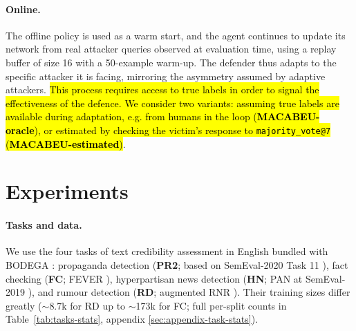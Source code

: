 \documentclass[11pt]{article}
\begin{document}
\paragraph{Online.} The offline policy is used as a warm start, and the agent continues to update its network from real attacker queries observed at evaluation time, using a replay buffer of size 16 with a 50-example warm-up. The defender thus adapts to the specific attacker it is facing, mirroring the asymmetry assumed by adaptive attackers. \hl{This process requires access to true labels in order to signal the effectiveness of the defence. We consider two variants: assuming true labels are available during adaptation, e.g. from humans in the loop (\textbf{MACABEU-oracle}), or estimated by checking the victim's response to \texttt{majority\_vote@7} (\textbf{MACABEU-estimated})}. 


\section{Experiments}
\label{sec:experiments}
\paragraph{Tasks and data.}
We use the four tasks of text credibility assessment in English bundled with BODEGA \citep{verifying_robustness}: propaganda detection (\textbf{PR2}; based on SemEval-2020 Task 11 \citep{DaSanMartino2020semeval}), fact checking (\textbf{FC}; FEVER \citep{Thorne2018fever}), hyperpartisan news detection (\textbf{HN}; PAN at SemEval-2019 \citep{Kiesel2019hyperpartisan}), and rumour detection (\textbf{RD}; augmented RNR \citep{Zubiaga2016rumours}). Their training sizes differ greatly ($\sim$8.7k for RD up to $\sim$173k for FC; full per-split counts in Table~\ref{tab:tasks-stats}, appendix \ref{sec:appendix-task-stats}).
\end{document}
